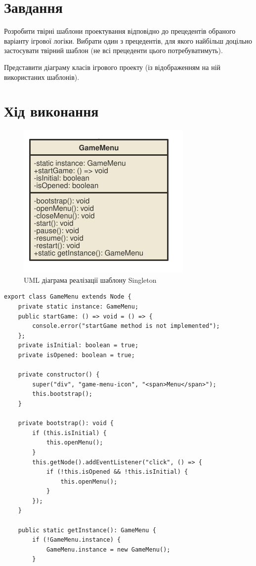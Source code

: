 \documentclass[oneside,14pt]{extarticle}
\begin{document}
\begin{normalsize}
	\section*{Завдання}
Розробити твірні шаблони проектування відповідно до прецедентів обраного варіанту
ігрової логіки. Вибрати один з прецедентів, для якого найбільш доцільно застосувати твірний
шаблон (не всі прецеденти цього потребуватимуть).

	Представити діаграму класів ігрового проекту (із відображенням на ній використаних
	шаблонів).

	\section*{Хід виконання}
	
	\begin{figure}[H]
		\centering
		\includegraphics[scale=1]{singleton}
		\caption{UML діаграма реалізації шаблону Singleton}
	\end{figure}
	
	\begin{small}
		\begin{lstlisting}
export class GameMenu extends Node {
	private static instance: GameMenu;
	public startGame: () => void = () => {
		console.error("startGame method is not implemented");
	};
	private isInitial: boolean = true;
	private isOpened: boolean = true;
	
	private constructor() {
		super("div", "game-menu-icon", "<span>Menu</span>");
		this.bootstrap();
	}
	
	private bootstrap(): void {
		if (this.isInitial) {
			this.openMenu();
		}
		this.getNode().addEventListener("click", () => {
			if (!this.isOpened && !this.isInitial) {
				this.openMenu();
			}
		});
	}
	
	public static getInstance(): GameMenu {
		if (!GameMenu.instance) {
			GameMenu.instance = new GameMenu();
		}
		

\end{lstlisting}
\end{small}
\end{normalsize}
\end{document}

